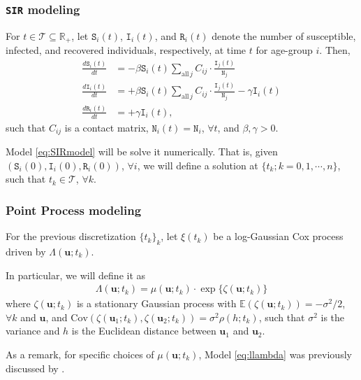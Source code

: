 \documentclass[12pt, aspectratio = 169]{beamer} %
\begin{document}
	\begin{frame}[t]
		\frametitle{\texttt{SIR} modeling}
		\justifying
		
		For $t \in \mathcal{T} \subseteq \mathbb{R}_{+}$, let $\texttt{S}_i(t)$, $\texttt{I}_i(t)$, and $\texttt{R}_i(t)$ denote the number of susceptible, infected, \hspace{-1pt}and recovered individuals, \hspace{-1pt}respectively,\hspace{-1pt} at time \hspace{-1pt}$t$ for age-group $i$. Then,
		\begin{align} \label{eq:SIRmodel}
			\frac{d\texttt{S}_i(t)}{dt} &= -\beta \texttt{S}_i(t) \sum_{\text{all}\,j}C_{ij}\cdot\frac{\texttt{I}_j(t)}{\texttt{N}_j} \\
			\frac{d\texttt{I}_i(t)}{dt} &= +\beta \texttt{S}_i(t) \sum_{\text{all}\,j}C_{ij}\cdot\frac{\texttt{I}_j(t)}{\texttt{N}_j} - \gamma \texttt{I}_i(t) \nonumber \\
			\frac{d\texttt{R}_i(t)}{dt} &= +\gamma \texttt{I}_i(t), \nonumber
		\end{align}
		such that $C_{ij}$ is a contact matrix, $\texttt{N}_i(t) = \texttt{N}_i$, $\forall t$, and $\beta, \gamma > 0$.
				
		\pause
				
		Model \eqref{eq:SIRmodel} will be solve it numerically. That is, given $(\texttt{S}_i(0), \texttt{I}_i(0), \texttt{R}_i(0))$, $\forall i$, we will define a solution at $\{t_k; k = 0, 1, \cdots, n\}$, such that $t_k \in \mathcal{T}$, $\forall k$.
		
	\end{frame}

	\begin{frame}[t]
		\frametitle{Point Process modeling}
		\justifying
		
		For the previous discretization  $\{t_k\}_k$, let $\xi(t_k)$ be a log-Gaussian Cox process driven by $\Lambda(\mathbf{u}; t_k)$.
		
		\pause
		
		In particular, we will define it as
		\begin{align} \label{eq:llambda}
			\Lambda(\mathbf{u}; t_k) = \mu(\mathbf{u}; t_k) \cdot \exp\{\zeta(\mathbf{u}; t_k)\}
		\end{align}
		where  $\zeta(\mathbf{u}; t_k)$ is a stationary Gaussian process with $\mathbb{E}(\zeta(\mathbf{u}; t_k)) = -\sigma^2/2$, $\forall k$ and $\mathbf{u}$, and $\text{Cov}(\zeta(\mathbf{u}_1; t_k), \zeta(\mathbf{u}_2; t_k)) = \sigma^2 \rho(h; t_k)$, such that  $\sigma^2$ is the variance and $h$ is the Euclidean distance between $\mathbf{u}_1$ and $\mathbf{u}_2$.
		
		As a remark, for specific choices of $\mu(\mathbf{u}; t_k)$, Model \eqref{eq:llambda} was previously discussed by \cite{diggle2006spatio}.
		
	\end{frame}
\end{document}
